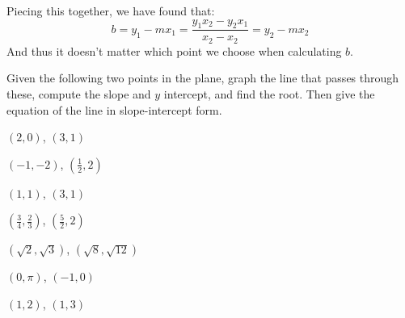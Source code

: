 \documentclass[crop=false,class=book,oneside]{standalone}                      %
\begin{document}
            Piecing this together, we have found that:
            \begin{equation}
                b=y_{1}-mx_{1}
                 =\frac{y_{1}x_{2}-y_{2}x_{1}}{x_{2}-x_{2}}
                 =y_{2}-mx_{2}
            \end{equation}
            And thus it doesn't matter which point we choose when calculating
            $b$.
            \newpage
            \begin{problem}
                Given the following two points in the plane,
                graph the line that passes through these, compute
                the slope and $y$ intercept, and find the root.
                Then give the equation of the line in slope-intercept
                form.
                \begin{enumerate}
                    \begin{multicols}{3}
                        \item $(2,0)$, $(3,1)$
                        \item $(\minus{1},\minus{2})$, $(\frac{1}{2},2)$
                        \item $(1,1)$, $(3,1)$
                        \item $(\frac{3}{4},\frac{2}{3})$, $(\frac{5}{2},2)$
                        \item $(\sqrt{2},\sqrt{3})$, $(\sqrt{8},\sqrt{12})$
                        \item $(0,\pi)$, $(\minus{1},0)$
                        \item $(1,2)$, $(1,3)$
                    \end{multicols}
                \end{enumerate}
            \end{problem}
\end{document}
